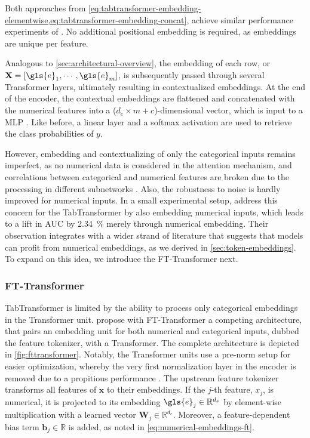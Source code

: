 Both approaches from \cref{eq:tabtransformer-embedding-elementwise,eq:tabtransformer-embedding-concat}, achieve similar performance experiments of \textcite[][11]{huangTabTransformerTabularData2020}. No additional positional embedding is required, as embeddings are unique per feature.

Analogous to \cref{sec:architectural-overview}, the embedding of each row, or $\mathbf{X} = [\gls{e}_1, \cdots, \gls{e}_m]$, is subsequently passed through several Transformer layers, ultimately resulting in contextualized embeddings. At the end of the encoder, the contextual embeddings are flattened and concatenated with the numerical features into a ($d_{e}\times m + c$)-dimensional vector, which is input to a \gls{MLP} \autocite[][3]{huangTabTransformerTabularData2020}. Like before, a linear layer and a softmax activation are used to retrieve the class probabilities of $y$.

However, embedding and contextualizing of only the categorical inputs remains imperfect, as no numerical data is considered in the attention mechanism, and correlations between categorical and numerical features are broken due to the processing in different subnetworks \autocite[][2]{somepalliSAINTImprovedNeural2021}. Also, the robustness to noise is hardly improved for numerical inputs. In a small experimental setup, \textcite[][8]{somepalliSAINTImprovedNeural2021} address this concern for the TabTransformer by also embedding numerical inputs, which leads to a lift in \gls{AUC} by \SI{2.34}{\percent} merely through numerical embedding. Their observation integrates with a wider strand of literature that suggests that models can profit from numerical embeddings, as we derived in \cref{sec:token-embeddings}. To expand on this idea, we introduce the FT-Transformer next.

\subsubsection{FT-Transformer}\label{sec:fttransformer}

TabTransformer is limited by the ability to process only categorical embeddings in the Transformer unit. \textcite[][5]{gorishniyRevisitingDeepLearning2021} propose with FT-Transformer a competing architecture, that pairs an embedding unit for both numerical and categorical inputs, dubbed the feature tokenizer, with a Transformer. The complete architecture is depicted in \cref{fig:fttransformer}. Notably, the Transformer units use a pre-norm setup for easier optimization, whereby the very first normalization layer in the encoder is removed due to a propitious performance \textcite[][17]{gorishniyRevisitingDeepLearning2021}. The upstream feature tokenizer transforms all features of $\mathbf{x}$ to their embeddings. If the $j$-th feature, $x_j$, is numerical, it is projected to its embedding $\gls{e}_j \in \mathbb{R}^{d_e}$ by element-wise multiplication with a learned vector $\mathbf{W}_j \in \mathbb{R}^{d_{e}}$. Moreover, a feature-dependent bias term $\mathbf{b}_j \in \mathbb{R}$ is added, as noted in \cref{eq:numerical-embeddings-ft}.

